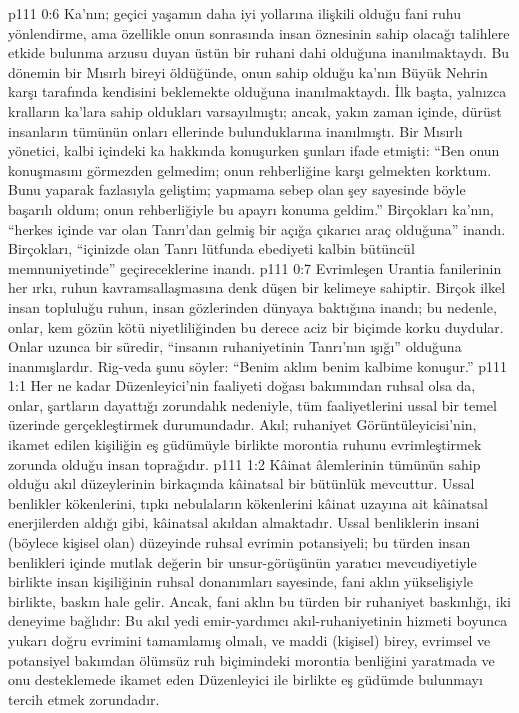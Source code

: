 \vs p111 0:6 Ka’nın; geçici yaşamın daha iyi yollarına ilişkili olduğu fani ruhu yönlendirme, ama özellikle onun sonrasında insan öznesinin sahip olacağı talihlere etkide bulunma arzusu duyan üstün bir ruhani dahi olduğuna inanılmaktaydı. Bu dönemin bir Mısırlı bireyi öldüğünde, onun sahip olduğu ka’nın Büyük Nehrin karşı tarafında kendisini beklemekte olduğuna inanılmaktaydı. İlk başta, yalnızca kralların ka’lara sahip oldukları varsayılmıştı; ancak, yakın zaman içinde, dürüst insanların tümünün onları ellerinde bulunduklarına inanılmıştı. Bir Mısırlı yönetici, kalbi içindeki ka hakkında konuşurken şunları ifade etmişti: “Ben onun konuşmasını görmezden gelmedim; onun rehberliğine karşı gelmekten korktum. Bunu yaparak fazlasıyla geliştim; yapmama sebep olan şey sayesinde böyle başarılı oldum; onun rehberliğiyle bu apayrı konuma geldim.” Birçokları ka’nın, “herkes içinde var olan Tanrı’dan gelmiş bir açığa çıkarıcı araç olduğuna” inandı. Birçokları, “içinizde olan Tanrı lütfunda ebediyeti kalbin bütüncül memnuniyetinde” geçireceklerine inandı.
\vs p111 0:7 Evrimleşen Urantia fanilerinin her ırkı, ruhun kavramsallaşmasına denk düşen bir kelimeye sahiptir. Birçok ilkel insan topluluğu ruhun, insan gözlerinden dünyaya baktığına inandı; bu nedenle, onlar, kem gözün kötü niyetliliğinden bu derece aciz bir biçimde korku duydular. Onlar uzunca bir süredir, “insanın ruhaniyetinin Tanrı’nın ışığı” olduğuna inanmışlardır. Rig\hyp{}veda şunu söyler: “Benim aklım benim kalbime konuşur.”
\vs p111 1:1 Her ne kadar Düzenleyici’nin faaliyeti doğası bakımından ruhsal olsa da, onlar, şartların dayattığı zorundalık nedeniyle, tüm faaliyetlerini ussal bir temel üzerinde gerçekleştirmek durumundadır. Akıl; ruhaniyet Görüntüleyicisi’nin, ikamet edilen kişiliğin eş güdümüyle birlikte morontia ruhunu evrimleştirmek zorunda olduğu insan toprağıdır.
\vs p111 1:2 Kâinat âlemlerinin tümünün sahip olduğu akıl düzeylerinin birkaçında kâinatsal bir bütünlük mevcuttur. Ussal benlikler kökenlerini, tıpkı nebulaların kökenlerini kâinat uzayına ait kâinatsal enerjilerden aldığı gibi, kâinatsal akıldan almaktadır. Ussal benliklerin insani (böylece kişisel olan) düzeyinde ruhsal evrimin potansiyeli; bu türden insan benlikleri içinde mutlak değerin bir unsur\hyp{}görüşünün yaratıcı mevcudiyetiyle birlikte insan kişiliğinin ruhsal donanımları sayesinde, fani aklın yükselişiyle birlikte, baskın hale gelir. Ancak, fani aklın bu türden bir ruhaniyet baskınlığı, iki deneyime bağlıdır: Bu akıl yedi emir\hyp{}yardımcı akıl\hyp{}ruhaniyetinin hizmeti boyunca yukarı doğru evrimini tamamlamış olmalı, ve maddi (kişisel) birey, evrimsel ve potansiyel bakımdan ölümsüz ruh biçimindeki morontia benliğini yaratmada ve onu desteklemede ikamet eden Düzenleyici ile birlikte eş güdümde bulunmayı tercih etmek zorundadır.
